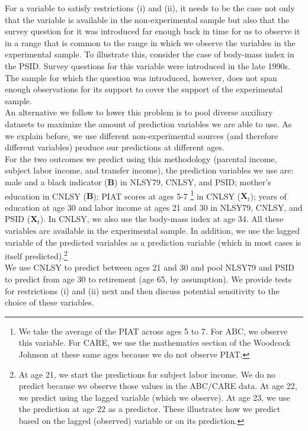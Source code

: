 \noindent For a variable to satisfy restrictions (i) and (ii), it needs to be the case not only that the variable is available in the non-experimental sample but also that the survey question for it was introduced far enough back in time for us to observe it in a range that is common to the range in which we observe the variables in the experimental sample. To illustrate this, consider the case of body-mass index in the PSID. Survey questions for this variable were introduced in the late 1990s. The sample for which the question was introduced, however, does not span enough observations for its support to cover the support of the experimental sample.\\

\noindent An alternative we follow to lower this problem is to pool diverse auxiliary datasets to maximize the amount of prediction variables we are able to use. As we explain before, we use different non-experimental sources (and therefore different variables) produce our predictions at different ages.\\

\noindent For the two outcomes we predict using this methodology (parental income, subject labor income, and transfer income), the prediction variables we use are: male and a black indicator ($\bm{B}$) in NLSY79, CNLSY, and PSID; mother's education in CNLSY ($\bm{B}$); PIAT scores at ages 5-7 \footnote{We take the average of the PIAT across ages 5 to 7. For ABC, we observe this variable. For CARE, we use the mathematics section of the Woodcock Johnson at these same ages because we do not observe PIAT.} in CNLSY ($\bm{X}_{t}$); years of education at age 30 and labor income at ages 21 and 30 in NLSY79, CNLSY, and PSID ($\bm{X}_{t}$). In CNLSY, we also use the body-mass index at age 34. All these variables are available in the experimental sample. In addition, we use the lagged variable of the predicted variables as a prediction variable (which in most cases is itself predicted).\footnote{At age 21, we start the predictions for subject labor income. We do no predict because we observe those values in the ABC/CARE data. At age 22, we predict using the lagged variable (which we observe). At age 23, we use the prediction at age 22 as a predictor. These illustrates how we predict based on the lagged (observed) variable or on its prediction.} \\

\noindent We use CNLSY to predict between ages 21 and 30 and pool NLSY79 and PSID to predict from age 30 to retirement (age 65, by assumption). We provide tests for restrictions (i) and (ii) next and then discuss potential sensitivity to the choice of these variables.


